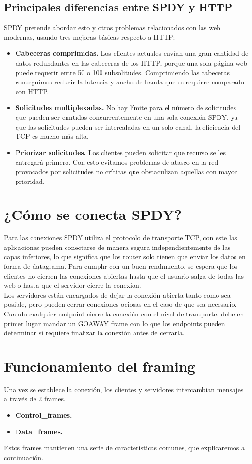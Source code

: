 \subsection{Principales diferencias entre SPDY y HTTP}
SPDY pretende abordar esto y otros problemas relacionados con las web modernas, usando tres mejoras básicas respecto a HTTP:
\begin{itemize}
\item \textbf{Cabeceras comprimidas.} Los clientes actuales envían una gran cantidad de datos redundantes en las cabeceras de los HTTP, porque una sola página web puede requerir entre 50 o 100 subsolitudes. Comprimiendo las cabeceras conseguimos reducir la latencia y ancho de banda que se requiere comparado con HTTP.
\item \textbf{Solicitudes multiplexadas.}  No hay límite para el número de solicitudes que pueden ser emitidas concurrentemente en una sola conexión SPDY, ya que las solicitudes pueden ser intercaladas en un solo canal, la eficiencia del TCP es mucho más alta.
\item \textbf{Priorizar solicitudes.} Los clientes pueden solicitar que recurso se les entregará primero. Con esto evitamos problemas  de atasco en la red provocados por solicitudes no críticas que obstaculizan aquellas con mayor prioridad.
\end{itemize}

\section{¿Cómo se conecta SPDY?}
Para las conexiones SPDY utiliza el protocolo de transporte TCP,  con este las aplicaciones pueden conectarse de manera segura independientemente de las capas inferiores, lo que significa que los router solo tienen que enviar los datos en forma de datagrama. Para cumplir con un buen rendimiento, se espera que los clientes no cierren las conexiones abiertas hasta que el usuario salga de todas las web o hasta que el servidor cierre la conexión. 
\\
Los servidores están encargados de dejar la conexión abierta tanto como sea posible, pero pueden cerrar conexiones ociosas en el caso de que sea necesario.
\\
Cuando cualquier endpoint cierre la conexión con el nivel de transporte, debe en primer lugar mandar un GOAWAY frame con lo que los endpoints pueden determinar si requiere finalizar la conexión antes de cerrarla.

\section{Funcionamiento del framing}
Una vez se establece la conexión, los clientes y servidores intercambian mensajes a través de 2 frames.
\begin{itemize}
\item \textbf{Control\_frames.}
\item \textbf{Data\_frames.}
\end{itemize}
Estos frames mantienen una serie de características comunes, que explicaremos a continuación.

